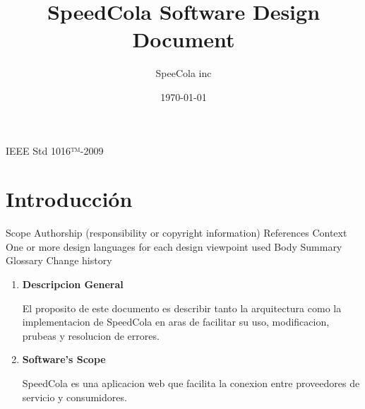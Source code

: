 \documentclass{article}
\title{SpeedCola Software Design Document}
\date{\today}%
\author{SpeeCola inc}%
\begin{document}
\maketitle
IEEE Std 1016™-2009

\newpage
{}

\section{Introducci\'on}
Scope
   Authorship (responsibility or copyright information)
   References
   Context
   One or more design languages for each design viewpoint used
   Body
   Summary
   Glossary
   Change history

  \begin{enumerate}
    \item  \textbf{Descripcion General}

  El proposito de este documento es describir tanto la arquitectura como la implementacion de 
  SpeedCola en aras de facilitar su uso, modificacion, prubeas y resolucion de errores.

  \item \textbf{Software's Scope}

  SpeedCola es una aplicacion web que facilita la conexion entre proveedores de servicio y consumidores.

  \end{enumerate}
\end{document}
